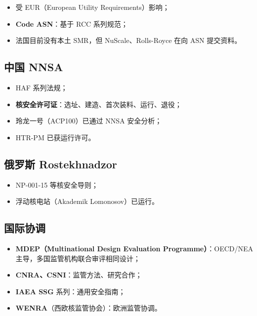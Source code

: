 \documentclass[
  UTF8,
  scheme=plain,
  fontsize=10pt,
  openany
]{ctexbook}
\begin{document}
\begin{itemize}
\tightlist
\item
  受 EUR（European Utility Requirements）影响；
\item
  \textbf{Code ASN}：基于 RCC 系列规范；
\item
  法国目前没有本土 SMR，但 NuScale、Rolls-Royce 在向 ASN 提交资料。
\end{itemize}

\subsection{中国 NNSA}\label{ux4e2dux56fd-nnsa}

\begin{itemize}
\tightlist
\item
  HAF 系列法规；
\item
  \textbf{核安全许可证}：选址、建造、首次装料、运行、退役；
\item
  玲龙一号（ACP100）已通过 NNSA 安全分析；
\item
  HTR-PM 已获运行许可。
\end{itemize}

\subsection{俄罗斯
Rostekhnadzor}\label{ux4fc4ux7f57ux65af-rostekhnadzor}

\begin{itemize}
\tightlist
\item
  NP-001-15 等核安全导则；
\item
  浮动核电站（Akademik Lomonosov）已运行。
\end{itemize}

\subsection{国际协调}\label{ux56fdux9645ux534fux8c03}

\begin{itemize}
\tightlist
\item
  \textbf{MDEP（Multinational Design Evaluation Programme）}：OECD/NEA
  主导，多国监管机构联合审评相同设计；
\item
  \textbf{CNRA、CSNI}：监管方法、研究合作；
\item
  \textbf{IAEA SSG} 系列：通用安全指南；
\item
  \textbf{WENRA}（西欧核监管协会）：欧洲监管协调。
\end{itemize}
\end{document}
